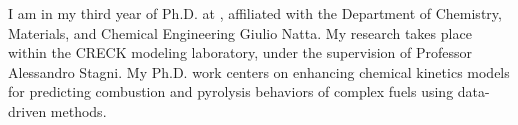 I am in my third year of Ph.D. at \polimi, affiliated with the Department of
Chemistry, Materials, and Chemical Engineering Giulio Natta. My research takes place
within the CRECK modeling laboratory, under the supervision of Professor Alessandro
Stagni. My Ph.D. work centers on enhancing chemical kinetics models for predicting
combustion and pyrolysis behaviors of complex fuels using data-driven methods.
%
%
%
